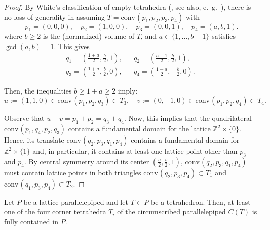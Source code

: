 \documentclass[12pt]{article}
\newcommand{\Z}{ \ensuremath{\mathbb{Z}}}
\newcommand{\conv}{\ensuremath{\mathrm{conv}}\hspace{1pt}}
\begin{document}
\begin{proof}
By White's classification of empty tetrahedra (\cite{White1964}, see also, e.~g.~\cite[Sect.~4.1]{HPPS-survey}), there is no loss of generality in assuming $T=\conv(p_1,p_2,p_3,p_4)$ with
\[
p_1=(0,0,0), \quad
p_2=(1,0,0), \quad
p_3=(0,0,1), \quad
p_4=(a,b,1).
\]
where $b\ge 2$ is the (normalized) volume of $T$, and $a\in \{1,\dots,b-1\}$ satisfies $\gcd(a,b)=1$. This gives 
\begin{align*}
q_1=\left(\frac{1+a}2,\frac{b}2,1\right), &&
q_2=\left(\frac{a-1}2,\frac{b}2,1\right), \quad\\
q_3=\left(\frac{1+a}2,\frac{b}2,0\right), &&
q_4=\left(\frac{1-a}2,-\frac{b}2,0\right).
\end{align*}

Then, the inequalities $b\ge 1+a \ge 2$ imply:
\[
u:=(1,1,0)\in \conv(p_1,p_2,q_3) \subset T_3, \quad
v:=(0,-1,0)\in \conv(p_1,p_2,q_4) \subset T_4.
\]

Observe that $u+v=p_1+p_2=q_3+q_4$.
Now, this implies that the quadrilateral $\conv(p_1,q_4,p_2,q_3)$ contains a fundamental domain for the lattice $\Z^2\times\{0\}$. Hence, its translate $\conv(q_2,p_3,q_1,p_4)$ contains a fundamental domain for $\Z^2\times\{1\}$ and, in particular, it contains at least one lattice point other than $p_3$ and $p_4$. By central symmetry around its center $\left(\frac{a}2,\frac{b}2,1\right)$, $\conv(q_2,p_3,q_1,p_4)$ must contain lattice points in both triangles $\conv(q_2,p_3,p_4)\subset T_1$ and $\conv(q_1,p_3,p_4)\subset T_2$.

\end{proof}


\begin{lemma}
\label{lemma:3<4}
Let $P$ be a lattice parallelepiped and let $T\subset P$ be a tetrahedron. Then, at least one of the four corner tetrahedra $T_i$ of the circumscribed parallelepiped $C(T)$ is fully contained in $P$.
\end{lemma}
\end{document}
